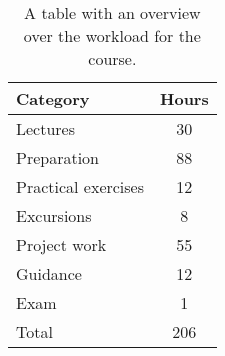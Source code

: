 \begin{table}[h]
    \centering
    \caption{A table with an overview over the workload for the course.}
    \label{tab:workload}
    \begin{tabular}{ l | c}
        \textbf{Category} & \textbf{Hours} \\ 
        \hline
        Lectures & 30 \\ 

        Preparation & 88 \\

        Practical exercises & 12 \\ 

        Excursions & 8 \\

        Project work & 55 \\

        Guidance & 12 \\

        Exam & 1 \\ 
        \hline
        Total & 206 \\ 
    \end{tabular}
\end{table}





\newpage